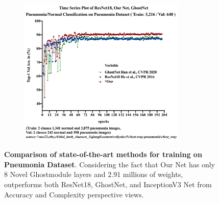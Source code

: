 \begin{figure}[t]
\centering
\includegraphics[height=200pt,width=0.9\textwidth]{thesis-template-master/images/Pneumonia_TimeSeries-1.png}
\label{fig}
\centering
\caption{ \textbf{Comparison of state-of-the-art  methods for training on Pneumonia Dataset}.  Considering the fact that Our Net has only 8 Novel Ghostmodule layers and 2.91 millions of weights, outperforms both ResNet18\cite{20}, GhostNet\cite{19}, and InceptionV3 Net\cite{38} from Accuracy and Complexity perspective views.}
\label{fig:4.12}
\end{figure}


